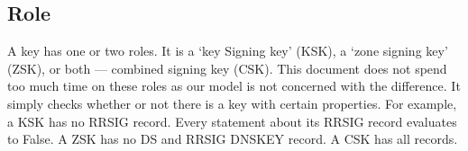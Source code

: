 \documentclass[twoside, a4paper]{article}
\begin{document}
\subsection{Role}

A key has one or two roles. It is a `key Signing key' (KSK), a `zone 
signing key' (ZSK), or both --- combined signing key (CSK). This 
document does not spend too much time on these roles as our model 
is not concerned with the difference. It simply checks whether or not 
there is a key with certain properties. For example, a KSK has no 
RRSIG record. Every statement about its RRSIG record evaluates to 
False. A ZSK has no DS and RRSIG DNSKEY record. A CSK has all records.

\end{document}
